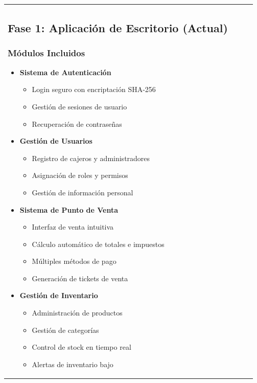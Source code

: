 \documentclass[12pt,letterpaper]{article}
\begin{document}
\begin{longtable}{|p{3cm}|p{2cm}|p{4cm}|p{6cm}|}
\subsection{Fase 1: Aplicación de Escritorio (Actual)}

\subsubsection{Módulos Incluidos}
\begin{itemize}
    \item \textbf{Sistema de Autenticación}
    \begin{itemize}
        \item Login seguro con encriptación SHA-256
        \item Gestión de sesiones de usuario
        \item Recuperación de contraseñas
    \end{itemize}
    
    \item \textbf{Gestión de Usuarios}
    \begin{itemize}
        \item Registro de cajeros y administradores
        \item Asignación de roles y permisos
        \item Gestión de información personal
    \end{itemize}
    
    \item \textbf{Sistema de Punto de Venta}
    \begin{itemize}
        \item Interfaz de venta intuitiva
        \item Cálculo automático de totales e impuestos
        \item Múltiples métodos de pago
        \item Generación de tickets de venta
    \end{itemize}
    
    \item \textbf{Gestión de Inventario}
    \begin{itemize}
        \item Administración de productos
        \item Gestión de categorías
        \item Control de stock en tiempo real
        \item Alertas de inventario bajo
    \end{itemize}
    

\end{itemize}
\end{longtable}
\end{document}
